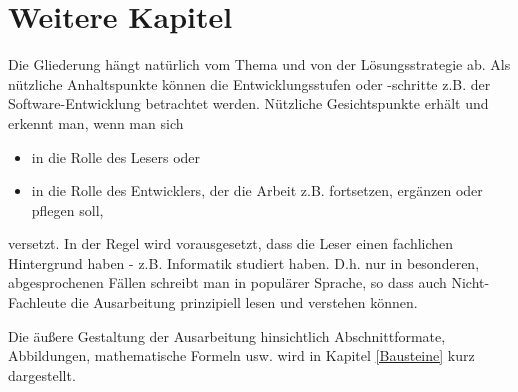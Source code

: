 \chapter{Weitere Kapitel}

Die Gliederung hängt natürlich vom Thema und von der Lösungsstrategie ab. Als nützliche Anhaltspunkte können die Entwicklungsstufen oder -schritte z.B. der Software-Entwicklung betrachtet werden. Nützliche Gesichtspunkte erhält und erkennt man, wenn man sich

\begin{itemize}
	\item in die Rolle des Lesers oder
	\item in die Rolle des Entwicklers, der die Arbeit z.B. fortsetzen, ergänzen oder pflegen soll,
\end{itemize}

versetzt. In der Regel wird vorausgesetzt, dass die Leser einen fachlichen Hintergrund haben - z.B. Informatik studiert haben. D.h. nur in besonderen, abgesprochenen Fällen schreibt man in populärer Sprache, so dass auch Nicht-Fachleute die Ausarbeitung prinzipiell lesen und verstehen können.

Die äußere Gestaltung der Ausarbeitung hinsichtlich Abschnittformate, Abbildungen, mathematische Formeln usw. wird in Kapitel \ref{Bausteine} kurz dargestellt.
